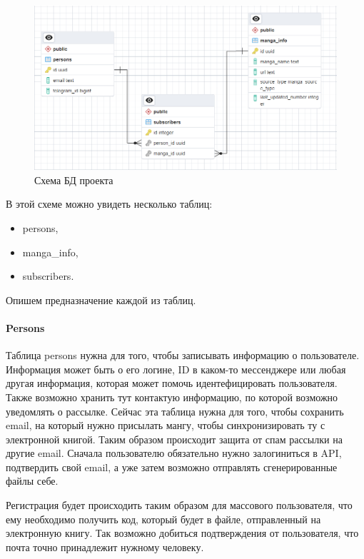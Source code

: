 \begin{figure}
    \includegraphics[scale=0.5]{imgs/db-struct}
    \caption{Схема БД проекта}
    \label{db-struct-pic}
\end{figure}

В этой схеме можно увидеть несколько таблиц:
\begin{itemize}
    \item persons,
    \item manga\_info,
    \item subscribers.
\end{itemize}

Опишем предназначение каждой из таблиц.

\paragraph{Persons}
Таблица persons нужна для того, чтобы записывать информацию о пользователе. 
Информация может быть о его логине, ID в каком-то мессенджере или любая другая информация, которая может помочь идентефицировать пользователя.
Также возможно хранить тут контактую информацию, по которой возможно уведомлять о рассылке.
Сейчас эта таблица нужна для того, чтобы сохранить email, на который нужно присылать мангу, чтобы синхронизировать ту с электронной книгой.
Таким образом происходит защита от спам рассылки на другие email. Сначала пользователю обязательно нужно залогиниться в API, подтвердить свой email,
а уже затем возможно отправлять сгенерированные файлы себе.

Регистрация будет происходить таким образом для массового пользователя, что ему необходимо получить код, который будет в файле, отправленный на электронную книгу.
Так возможно добиться подтверждения от пользователя, что почта точно принадлежит нужному человеку.

